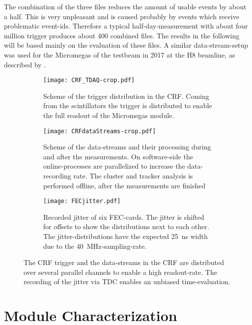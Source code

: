 \documentclass[
twoside,            %
BCOR1.4cm,          %
10pt,               %
headings=normal,    %
headsepline,        %
clearplainpage,		%
final,              %
div=14,
open=right,
bibliography=toc
]{scrreprt}
\begin{document}
The combination of the three files reduces the amount of usable events by about a half. 
This is very unpleasant and is caused probably by events which receive problematic event-ids.
Therefore a typical half-day-measurement with about four million trigger produces about 400 combined files.
The results in the following will be based mainly on the evaluation of these files.
A similar data-stream-setup was used for the Micromegas of the testbeam in 2017 at the H8 beamline, as described by \cite{flierlThesis}.

\begin{figure}[!h]
	\begin{subfigure}[b]{\textwidth}
		\centering
		\texttt{[image: CRF\_TDAQ-crop.pdf]}
		\caption{
			Scheme of the trigger distribution in the CRF.
			Coming from the scintillators the trigger is distributed to enable the full readout of the Micromegas module.
		}
		\label{CRFtriggerScheme} 
		\vspace{5mm}
	\end{subfigure}
	\begin{subfigure}[b]{\textwidth}
		\centering
		\texttt{[image: CRFdataStreams-crop.pdf]}
		\caption{
			Scheme of the data-streams and their processing during and after the measurements.
			On software-side the online-processes are parallelized to increase the data-recording rate.
			The cluster and tracker analysis is performed offline, after the measurements are finished
		}
		\label{CRFdataStreams} 
		\vspace{5mm}
	\end{subfigure}
	\begin{subfigure}[b]{\textwidth}
		\centering
		\texttt{[image: FECjitter.pdf]}
		\caption{
			Recorded jitter of six FEC-cards.
			The jitter is shifted for offsets to show the distributions next to each other.
			The jitter-distributions have the expected \SI{25}{ns} width due to the \SI{40}{MHz}-sampling-rate.
		}
		\label{FECjitter} 
	\end{subfigure}
	\vspace{-5mm}
	\caption{
		The CRF trigger and the data-streams in the CRF are distributed over several parallel channels to enable a high readout-rate.
		The recording of the jitter via TDC enables an unbiased time-evaluation.
	}
\end{figure}

\chapter{Module Characterization}
\end{document}
